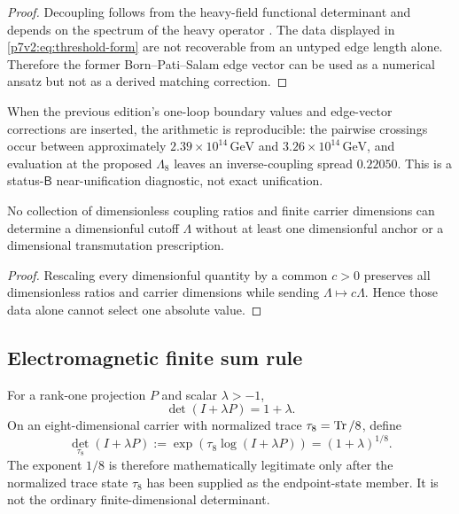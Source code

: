 \documentclass[12pt,a4paper]{article}
\begin{document}
\begin{proof}
Decoupling follows from the heavy-field functional determinant and depends on
the spectrum of the heavy operator
\cite{AppelquistCarazzone1975,Vassilevich2003HeatKernel}.  The data displayed
in \eqref{p7v2:eq:threshold-form} are not recoverable from an untyped edge
length alone.  Therefore the former Born--Pati--Salam edge vector can be used
as a numerical ansatz but not as a derived matching correction.
\end{proof}

\begin{remark}
When the previous edition's one-loop boundary values and edge-vector
corrections are inserted, the arithmetic is reproducible: the pairwise
crossings occur between approximately
\(2.39\times10^{14}\,\mathrm{GeV}\) and
\(3.26\times10^{14}\,\mathrm{GeV}\), and evaluation at the proposed
\(\Lambda_8\) leaves an inverse-coupling spread \(0.22050\).  This is a
status-\(\mathsf B\) near-unification diagnostic, not exact unification.
\end{remark}

\begin{lemma}
\label{p7v2:lem:absolute-scale}
No collection of dimensionless coupling ratios and finite carrier dimensions
can determine a dimensionful cutoff \(\Lambda\) without at least one
dimensionful anchor or a dimensional transmutation prescription.
\end{lemma}

\begin{proof}
Rescaling every dimensionful quantity by a common \(c>0\) preserves all
dimensionless ratios and carrier dimensions while sending
\(\Lambda\mapsto c\Lambda\).  Hence those data alone cannot select one
absolute value.
\end{proof}

\subsection{Electromagnetic finite sum rule}
\label{p7v2:sec:em-sum-rule}

\begin{definition}
\label{p7v2:def:normalized-determinant}
For a rank-one projection \(P\) and scalar \(\lambda>-1\),
\begin{equation}
\label{p7v2:eq:ordinary-vs-normalized-det}
 \det(I+\lambda P)=1+\lambda.
\end{equation}
On an eight-dimensional carrier with normalized trace
\(\tau_8=\operatorname{Tr}/8\), define
\begin{equation}
\label{p7v2:eq:normalized-det}
 \det_{\tau_8}(I+\lambda P)
 :=
 \exp\!\left(\tau_8\log(I+\lambda P)\right)
 =(1+\lambda)^{1/8}.
\end{equation}
The exponent \(1/8\) is therefore mathematically legitimate only after the
normalized trace state \(\tau_8\) has been supplied as the endpoint-state
member.  It is not the ordinary
finite-dimensional determinant.
\end{definition}
\end{document}
